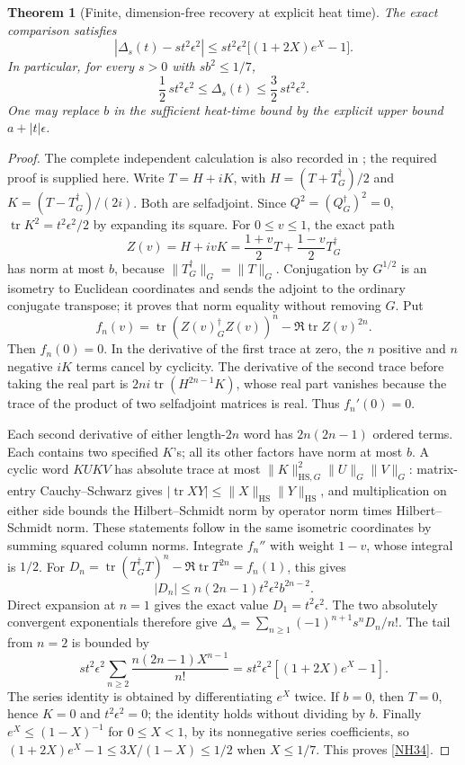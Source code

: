 \documentclass[11pt]{article}
\newcommand{\tr}{\operatorname{tr}}\newcommand{\dd}{\dagger_G}
\newcommand{\eps}{\epsilon}\newcommand{\spec}{\operatorname{spec}}
\newtheorem{theorem}{Theorem}[section]
\begin{document}
\begin{theorem}[Finite, dimension-free recovery at explicit heat time]
The exact comparison satisfies
\begin{equation}\tag{NH33}\label{NH33}
\left|\Delta_s(t)-st^2\eps^2\right|
\le st^2\eps^2\bigl[(1+2X)e^X-1\bigr].
\end{equation}
In particular, for every \(s>0\) with \(sb^2\le1/7\),
\begin{equation}\tag{NH34}\label{NH34}
\frac12\,st^2\eps^2\le\Delta_s(t)
\le\frac32\,st^2\eps^2 .
\end{equation}
One may replace \(b\) in the sufficient heat-time bound
by the explicit upper bound \(a+|t|\eps\).
\end{theorem}
\begin{proof}
The complete independent calculation is also recorded
in \cite{MetricHeat}; the required proof is supplied here.
Write \(T=H+iK\), with
\(H=(T+T^\dd)/2\) and \(K=(T-T^\dd)/(2i)\).
Both are selfadjoint. Since \(Q^2=(Q^\dd)^2=0\),
\(\tr K^2=t^2\eps^2/2\) by expanding its square.
For \(0\le v\le1\), the exact path
\[
Z(v)=H+ivK=\frac{1+v}{2}T+\frac{1-v}{2}T^\dd
\]
has norm at most \(b\), because \(\|T^\dd\|_G=\|T\|_G\).
Conjugation by \(G^{1/2}\) is an isometry to Euclidean
coordinates and sends the adjoint to the ordinary
conjugate transpose; it proves that norm equality
without removing \(G\).
Put
\[
f_n(v)=\tr(Z(v)^\dd Z(v))^n-\Re\tr Z(v)^{2n}.
\]
Then \(f_n(0)=0\). In the derivative of the first
trace at zero, the \(n\) positive and \(n\) negative
\(iK\) terms cancel by cyclicity. The derivative of the
second trace before taking the real part is
\(2ni\tr(H^{2n-1}K)\), whose real part vanishes because
the trace of the product of two selfadjoint matrices
is real. Thus \(f_n'(0)=0\).

Each second derivative of either length-\(2n\) word
has \(2n(2n-1)\) ordered terms. Each contains two
specified \(K\)'s; all its other factors have norm at
most \(b\). A cyclic word \(KUKV\) has absolute trace
at most \(\|K\|_{\mathrm{HS},G}^2\|U\|_G\|V\|_G\):
matrix-entry Cauchy--Schwarz gives
\(|\tr XY|\le\|X\|_{\mathrm{HS}}\|Y\|_{\mathrm{HS}}\),
and multiplication on either side bounds the
Hilbert--Schmidt norm by operator norm times
Hilbert--Schmidt norm. These statements follow in the
same isometric coordinates by summing squared column
norms. Integrate \(f_n''\) with weight \(1-v\),
whose integral is \(1/2\). For
\(D_n=\tr(T^\dd T)^n-\Re\tr T^{2n}=f_n(1)\), this gives
\[
|D_n|\le n(2n-1)t^2\eps^2 b^{2n-2}.
\]
Direct expansion at \(n=1\) gives the exact value
\(D_1=t^2\eps^2\).
The two absolutely convergent exponentials therefore give
\(\Delta_s=\sum_{n\ge1}(-1)^{n+1}s^nD_n/n!\).
The tail from \(n=2\) is bounded by
\[
st^2\eps^2
\sum_{n\ge2}\frac{n(2n-1)X^{n-1}}{n!}
=st^2\eps^2[(1+2X)e^X-1].
\]
The series identity is obtained by differentiating
\(e^X\) twice. If \(b=0\), then \(T=0\), hence
\(K=0\) and \(t^2\eps^2=0\); the identity holds without
dividing by \(b\). Finally \(e^X\le(1-X)^{-1}\) for
\(0\le X<1\), by its nonnegative series coefficients,
so \((1+2X)e^X-1\le3X/(1-X)\le1/2\) when
\(X\le1/7\). This proves \eqref{NH34}.
\end{proof}
\end{document}
